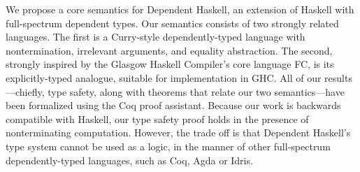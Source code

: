 We propose a core semantics for Dependent Haskell, an extension of Haskell
with full-spectrum dependent types. Our semantics consists of two strongly
related languages. The first is a Curry-style dependently-typed language with
nontermination, irrelevant arguments, and equality abstraction. The second,
strongly inspired by the Glasgow Haskell Compiler's core language FC, is its
explicitly-typed analogue, suitable for implementation in GHC. All of our
results---chiefly, type safety, along with theorems that relate our two
semantics---have been formalized using the Coq proof assistant. Because our
work is backwards compatible with Haskell, our type safety proof holds in the
presence of nonterminating computation. However, the trade off is that
Dependent Haskell's type system cannot be used as a logic, in the manner of
other full-spectrum dependently-typed languages, such as Coq, Agda or Idris.

